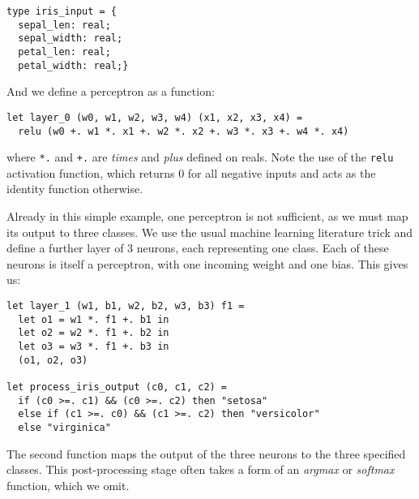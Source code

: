 \documentclass[runningheads]{llncs}
\begin{document}
\begin{lstlisting}[language=caml]
type iris_input = {
  sepal_len: real;
  sepal_width: real;
  petal_len: real;
  petal_width: real;}
\end{lstlisting}

\begin{comment}
To process inputs of this type in the future, we can simply define

\begin{lstlisting}[language=caml]
let process_iris_input (x: iris_input) =
  let x0 = x.sepal_len in
  let x1 = x.sepal_width in
  let x2 = x.petal_len in
  let x3 = x.petal_width in
  (x1, x2, x3, x4)
\end{lstlisting}
\end{comment}

And we define a perceptron as a function:

\begin{lstlisting}[language=caml]
let layer_0 (w0, w1, w2, w3, w4) (x1, x2, x3, x4) =
  relu (w0 +. w1 *. x1 +. w2 *. x2 +. w3 *. x3 +. w4 *. x4)
\end{lstlisting}
where \lstinline{*.} and   \lstinline{+.} are \emph{times} and \emph{plus} defined on reals.  Note the use of the \lstinline{relu} activation function, which returns $0$ for all negative inputs and acts as the identity function otherwise.

Already in this simple example, one perceptron is not sufficient, as we must map its output to three classes. We use the usual machine learning literature trick and define a further layer of $3$ neurons, each representing one class. Each of these neurons is itself a perceptron, with one incoming weight and one bias. This gives us:

\begin{lstlisting}[language=caml]
let layer_1 (w1, b1, w2, b2, w3, b3) f1 =
  let o1 = w1 *. f1 +. b1 in
  let o2 = w2 *. f1 +. b2 in
  let o3 = w3 *. f1 +. b3 in
  (o1, o2, o3)

let process_iris_output (c0, c1, c2) =
  if (c0 >=. c1) && (c0 >=. c2) then "setosa"
  else if (c1 >=. c0) && (c1 >=. c2) then "versicolor"
  else "virginica"
\end{lstlisting}

\noindent The second function maps the output of the three neurons to the three specified classes. This post-processing stage often takes a
form of an \emph{argmax} or \emph{softmax} function, which we omit. %
\end{document}
